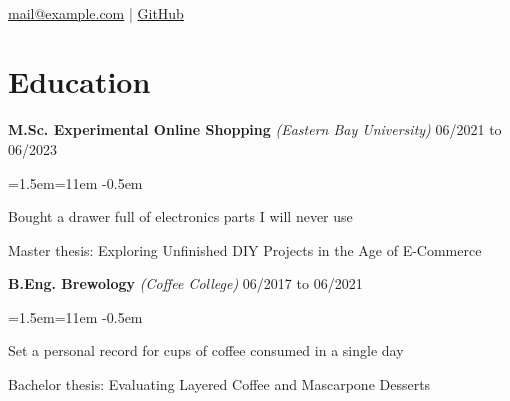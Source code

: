 \documentclass{article}
\author{John Doe}
\makeatletter
\renewcommand{\maketitle} {
	\begin{center}
		{\huge\bfseries\theauthor} \\
		\href{mailto:mail@example.com}{mail@example.com} | 
		\href{https://github.com/example}{GitHub}
		\vspace{.25em}
	\end{center}

}
\newcommand{\tinybullet}{\raisebox{0.25ex}{\tiny$\bullet$}}
\newenvironment{hsSubsection}[4]{ %
	{\bf #1} {\em (#3)} \hfill {#2} %
	\begin{list}{\tinybullet}{\leftmargin=1.5em\rightmargin=11em} %
		\itemsep -0.5em \vspace{-0.5em} %
	}{
	\end{list}
	\vspace{0.5em} %
}
\makeatother
\begin{document}
\begin{minipage}{.73\textwidth}
	\maketitle
\end{minipage}
\begin{minipage}{35mm}
	{
		\setlength{\fboxsep}{0pt}
		\setlength{\fboxrule}{0.5pt}
	}
\end{minipage}

\section{Education}

\begin{hsSubsection}{M.Sc. Experimental Online Shopping}{06/2021 to 06/2023}{Eastern Bay University}{}
	\item Bought a drawer full of electronics parts I will never use
	\item Master thesis: Exploring Unfinished DIY Projects in the Age of E-Commerce
\end{hsSubsection}
\begin{hsSubsection}{B.Eng. Brewology}{06/2017 to 06/2021}{Coffee College}{}
	\item Set a personal record for cups of coffee consumed in a single day
	\item Bachelor thesis: Evaluating Layered Coffee and Mascarpone Desserts
\end{hsSubsection}
\end{document}
